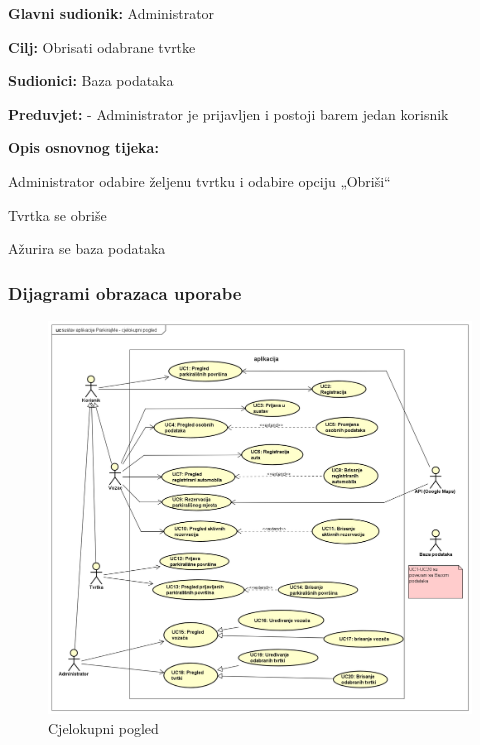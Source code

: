 					\begin{packed_item}
						
						\item  \textbf{Glavni sudionik: } Administrator
						\item  \textbf{Cilj:} Obrisati odabrane tvrtke
						\item  \textbf{Sudionici:} Baza podataka
						\item  \textbf{Preduvjet:} - Administrator je prijavljen i postoji barem jedan korisnik
						\item  \textbf{Opis osnovnog tijeka:}
						
						\item[]	\begin{packed_enum}
							\item Administrator odabire željenu tvrtku i odabire opciju „Obriši“
							\item Tvrtka se obriše
							\item Ažurira se baza podataka
						\end{packed_enum}
					
					\end{packed_item}
							
			\eject		
			
				\subsubsection{Dijagrami obrazaca uporabe}
				
					\begin{figure}[H]
						\includegraphics[scale=0.4]{dijagrami/cjelokupni_pogled.png} %
						\centering
						\caption{Cjelokupni pogled}
						\label{fig:promjene}
					\end{figure}
				
